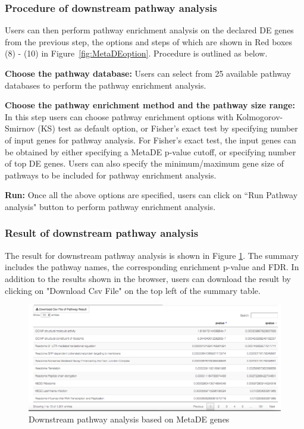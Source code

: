 \subsubsection{Procedure of downstream pathway analysis}
Users can then perform pathway enrichment analysis on the declared DE genes from the previous step, 
the options and steps of which are shown in {\color{red} Red boxes (8) - (10)} in Figure~\ref{fig:MetaDEoption}.
Procedure is outlined as below.

\begin{steps}
\item \textbf{Choose the pathway database:}
Users can select from 25 available pathway databases to perform the pathway enrichment analysis. 

\item \textbf{Choose the pathway enrichment method and the pathway size range:}
In this step users can choose pathway enrichment options with Kolmogorov-Smirnov (KS) test as default option,
or Fisher's exact test by specifying number of input genes for pathway analysis.
For Fisher's exact test, the input genes can be obtained by either specifying a MetaDE p-value cutoff, or specifying number of top DE genes.
Users can also specify the minimum/maximum gene size of pathways to be included for pathway enrichment analysis.

\item \textbf{Run:}
Once all the above options are specified, users can click on ``Run Pathway analysis" button to perform pathway enrichment analysis.

\end{steps}


\subsubsection{Result of downstream pathway analysis}

The result for downstream pathway analysis is shown in Figure \ref{fig:MetaDEresult2}. 
The summary includes the pathway names, the corresponding enrichment p-value and FDR. 
In addition to the results shown in the browser, 
users can download the result by clicking on "Download Csv File" on the top left of the summary table. 

\begin{figure}[H]
\begin{center}
\includegraphics[scale=0.4]{./figure/metaDE/MetaDE_pathway.png}
\caption{Downstream pathway analysis based on MetaDE genes}
\label{fig:MetaDEresult2}
\end{center}
\end{figure}



